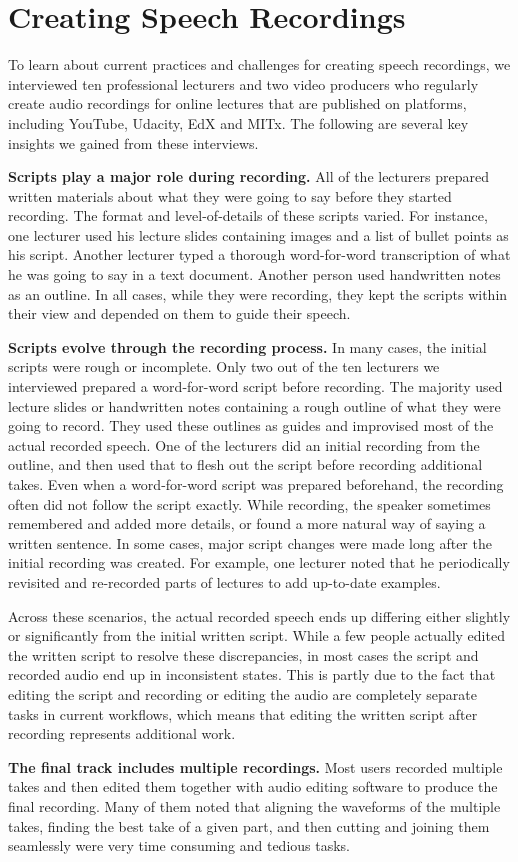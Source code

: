 \section{Creating Speech Recordings}

To learn about current practices and challenges for creating speech recordings, we interviewed ten professional lecturers and two video producers who regularly create audio recordings for online lectures that are published on platforms, including YouTube, Udacity, EdX and MITx. The following are several key insights we gained from these interviews.

\textbf{Scripts play a major role during recording.} All of the lecturers prepared written materials about what they were going to say before they started recording. The format and level-of-details of these scripts varied. For instance, one lecturer used his lecture slides containing images and a list of bullet points as his script. Another lecturer typed a thorough word-for-word transcription of what he was going to say in a text document. Another person used handwritten notes as an outline. In all cases, while they were recording, they kept the scripts within their view and depended on them to guide their speech.  

\textbf{Scripts evolve through the recording process.}  In many cases, the initial scripts were rough or incomplete. Only two out of the ten lecturers we interviewed prepared a word-for-word script before recording. The majority used lecture slides or handwritten notes containing a rough outline of what they were going to record. They used these outlines as guides and improvised most of the actual recorded speech. One of the lecturers did an initial recording from the outline, and then used that to flesh out the script before recording additional takes. Even when a word-for-word script was prepared beforehand, the recording often did not follow the script exactly. While recording, the speaker sometimes remembered and added more details, or found a more natural way of saying a written sentence. In some cases, major script changes were made long after the initial recording was created. For example, one lecturer noted that he periodically revisited and re-recorded parts of lectures to add up-to-date examples.

Across these scenarios, the actual recorded speech ends up differing either slightly or significantly from the initial written script.  While a few people actually edited the written script to resolve these discrepancies, in most cases the script and recorded audio end up in inconsistent states. This is partly due to the fact that editing the script and recording or editing the audio are  completely separate tasks in current workflows, which means that editing the written script after recording represents additional work.  

\textbf{The final track includes multiple recordings.} Most users recorded multiple takes and then edited them together with audio editing software to produce the final recording. Many of them noted that aligning the waveforms of the multiple takes, finding the best take of a given part, and then cutting and joining them seamlessly were very time consuming and tedious tasks.


